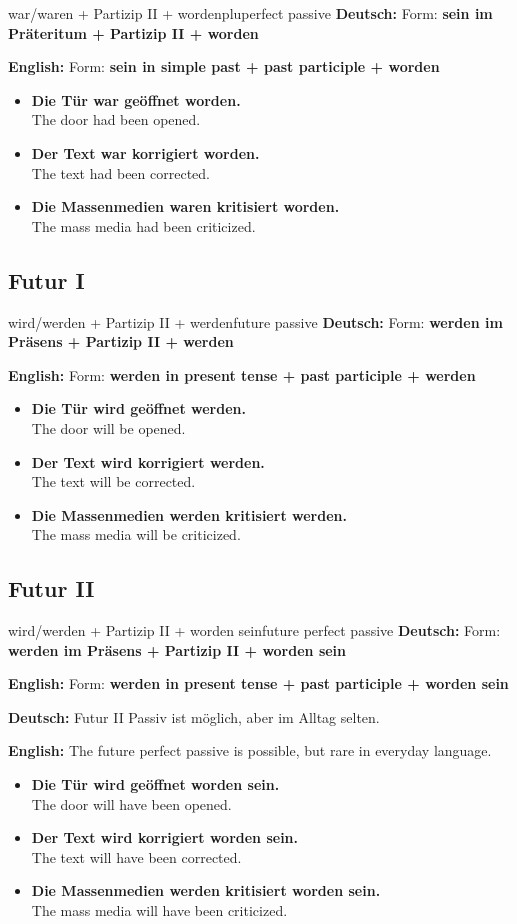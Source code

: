 \documentclass[a4paper,11pt]{article}
\newcommand{\GermanText}[1]{\textbf{Deutsch: }#1\par}
\newcommand{\EnglishText}[1]{{\small\color{SoftGray}\textbf{English: }#1\par}}
\newcommand{\ExampleItem}[2]{\item \textbf{#1}\\{\small\color{SoftGray}#2}}
\begin{document}
\begin{grammarentry}{war/waren + Partizip II + worden}{pluperfect passive}
\GermanText{Form: \textbf{sein im Präteritum + Partizip II + worden}}
\EnglishText{Form: \textbf{sein in simple past + past participle + worden}}

\begin{exbox}
\begin{itemize}
    \ExampleItem{Die Tür war geöffnet worden.}{The door had been opened.}
    \ExampleItem{Der Text war korrigiert worden.}{The text had been corrected.}
    \ExampleItem{Die Massenmedien waren kritisiert worden.}{The mass media had been criticized.}
\end{itemize}
\end{exbox}
\end{grammarentry}

\subsection{Futur I}

\begin{grammarentry}{wird/werden + Partizip II + werden}{future passive}
\GermanText{Form: \textbf{werden im Präsens + Partizip II + werden}}
\EnglishText{Form: \textbf{werden in present tense + past participle + werden}}

\begin{exbox}
\begin{itemize}
    \ExampleItem{Die Tür wird geöffnet werden.}{The door will be opened.}
    \ExampleItem{Der Text wird korrigiert werden.}{The text will be corrected.}
    \ExampleItem{Die Massenmedien werden kritisiert werden.}{The mass media will be criticized.}
\end{itemize}
\end{exbox}
\end{grammarentry}

\subsection{Futur II}

\begin{grammarentry}{wird/werden + Partizip II + worden sein}{future perfect passive}
\GermanText{Form: \textbf{werden im Präsens + Partizip II + worden sein}}
\EnglishText{Form: \textbf{werden in present tense + past participle + worden sein}}

\GermanText{Futur II Passiv ist möglich, aber im Alltag selten.}
\EnglishText{The future perfect passive is possible, but rare in everyday language.}

\begin{exbox}
\begin{itemize}
    \ExampleItem{Die Tür wird geöffnet worden sein.}{The door will have been opened.}
    \ExampleItem{Der Text wird korrigiert worden sein.}{The text will have been corrected.}
    \ExampleItem{Die Massenmedien werden kritisiert worden sein.}{The mass media will have been criticized.}
\end{itemize}
\end{exbox}
\end{grammarentry}
\end{document}
